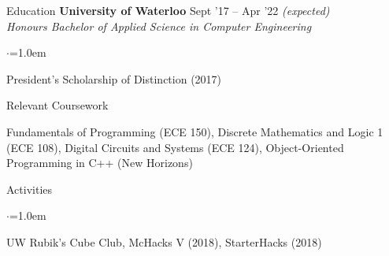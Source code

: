 \documentclass{resume} %
\begin{document}

\begin{rSection}{Education}
  {\bf University of Waterloo} \hfill {Sept '17 -- Apr '22 \em (expected)} \\
  {\em Honours Bachelor of Applied Science in Computer Engineering} %
  \begin{list}{$\cdot$}{\leftmargin=1.0em}
  \item President's Scholarship of Distinction (2017)
  \end{list}

  \begin{rProjectSection}{Relevant Coursework}{}
  \item Fundamentals of Programming (ECE 150), Discrete Mathematics and Logic 1 (ECE 108), Digital Circuits and Systems (ECE 124), Object-Oriented Programming in C++ (New Horizons)
  \end{rProjectSection}

\end{rSection}

\begin{rSection}{Activities}
\vspace{0.5em}
\begin{list}{$\cdot$}{\leftmargin=1.0em}
\item UW Rubik's Cube Club, McHacks V (2018), StarterHacks (2018)
\end{list}

\end{rSection}
\end{document}
